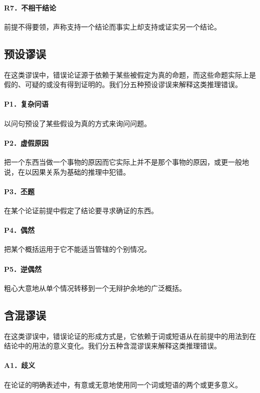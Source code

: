 \paragraph{R7．不相干结论}
前提不得要领，声称支持一个结论而事实上却支持或证实另一个结论。

\subsection*{预设谬误}
在这类谬误中，错误论证源于依赖于某些被假定为真的命题，而这些命题实际上是假的、可疑的或没有得到证明的。我们分五种预设谬误来解释这类推理错误。

\paragraph{P1．复杂问语}
以问句预设了某些假设为真的方式来询问问题。

\paragraph{P2．虚假原因}
把一个东西当做一个事物的原因而它实际上并不是那个事物的原因，或更一般地说，在以因果关系为基础的推理中犯错。

\paragraph{P3．丕题}
在某个论证前提中假定了结论要寻求确证的东西。

\paragraph{P4．偶然}
把某个概括运用于它不能适当管辖的个别情况。

\paragraph{P5．逆偶然}
粗心大意地从单个情况转移到一个无辩护余地的广泛概括。

\subsection*{含混谬误}
在这类谬误中，错误论证的形成方式是，它依赖于词或短语从在前提中的用法到在结论中的用法的意义变化。我们分五种含混谬误来解释这类推理错误。

\paragraph{A1．歧义}
在论证的明确表述中，有意或无意地使用同一个词或短语的两个或更多意义。

